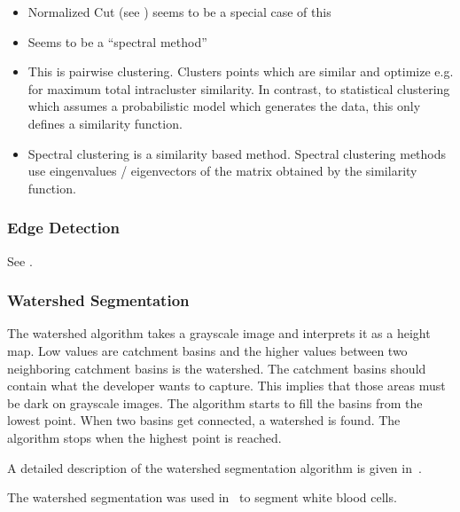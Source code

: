 \begin{itemize}
    \item Normalized Cut (see \cite{shi2000normalized}) seems to be a special
          case of this
    \item Seems to be a \enquote{spectral method}
    \item This is pairwise clustering. Clusters points which are similar and
          optimize e.g. for maximum total intracluster similarity. In contrast,
          to statistical clustering which assumes a probabilistic model which
          generates the data, this only defines a similarity function.
    \item Spectral clustering is a similarity based method. Spectral clustering
          methods use eingenvalues / eigenvectors of the matrix obtained by the
          similarity function.
\end{itemize}


\subsubsection{Edge Detection}

See \cite{kass1988snakes}.


\subsubsection{Watershed Segmentation}\label{subsec:watershed}
The watershed algorithm takes a grayscale image and interprets it as a height
map. Low values are catchment basins and the higher values between two
neighboring catchment basins is the watershed. The catchment basins should
contain what the developer wants to capture. This implies that those areas
must be dark on grayscale images. The algorithm starts to fill the basins from
the lowest point. When two basins get connected, a watershed is found. The
algorithm stops when the highest point is reached.

A detailed description of the watershed segmentation algorithm is given
in~\cite{roerdink2000watershed}.

The watershed segmentation was used in~\cite{1260033} to segment white blood
cells.



